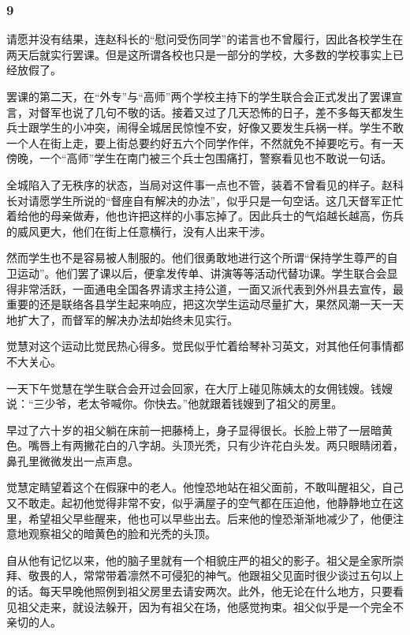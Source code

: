 \subsubsection*{9}

\par 请愿并没有结果，连赵科长的“慰问受伤同学”的诺言也不曾履行，因此各校学生在两天后就实行罢课。但是这所谓各校也只是一部分的学校，大多数的学校事实上已经放假了。
\par 罢课的第二天，在“外专”与“高师”两个学校主持下的学生联合会正式发出了罢课宣言，对督军也说了几句不敬的话。接着又过了几天恐怖的日子，差不多每天都发生兵士跟学生的小冲突，闹得全城居民惊惶不安，好像又要发生兵祸一样。学生不敢一个人在街上走，要上街总要约好五六个同学作伴，不然就免不掉要吃亏。有一天傍晚，一个“高师”学生在南门被三个兵士包围痛打，警察看见也不敢说一句话。
\par 全城陷入了无秩序的状态，当局对这件事一点也不管，装着不曾看见的样子。赵科长对请愿学生所说的“督座自有解决的办法”，似乎只是一句空话。这几天督军正忙着给他的母亲做寿，他也许把这样的小事忘掉了。因此兵士的气焰越长越高，伤兵的威风更大，他们在街上任意横行，没有人出来干涉。
\par 然而学生也不是容易被人制服的。他们很勇敢地进行这个所谓“保持学生尊严的自卫运动”。他们罢了课以后，便拿发传单、讲演等等活动代替功课。学生联合会显得非常活跃，一面通电全国各界请求主持公道，一面又派代表到外州县去宣传，最重要的还是联络各县学生起来响应，把这次学生运动尽量扩大，果然风潮一天一天地扩大了，而督军的解决办法却始终未见实行。
\par 觉慧对这个运动比觉民热心得多。觉民似乎忙着给琴补习英文，对其他任何事情都不大关心。
\par 一天下午觉慧在学生联合会开过会回家，在大厅上碰见陈姨太的女佣钱嫂。钱嫂说：“三少爷，老太爷喊你。你快去。”他就跟着钱嫂到了祖父的房里。
\par 早过了六十岁的祖父躺在床前一把藤椅上，身子显得很长。长脸上带了一层暗黄色。嘴唇上有两撇花白的八字胡。头顶光秃，只有少许花白头发。两只眼睛闭着，鼻孔里微微发出一点声息。
\par 觉慧定睛望着这个在假寐中的老人。他惶恐地站在祖父面前，不敢叫醒祖父，自己又不敢走。起初他觉得非常不安，似乎满屋子的空气都在压迫他，他静静地立在这里，希望祖父早些醒来，他也可以早些出去。后来他的惶恐渐渐地减少了，他便注意地观察祖父的暗黄色的脸和光秃的头顶。
\par 自从他有记忆以来，他的脑子里就有一个相貌庄严的祖父的影子。祖父是全家所崇拜、敬畏的人，常常带着凛然不可侵犯的神气。他跟祖父见面时很少谈过五句以上的话。每天早晚他照例到祖父房里去请安两次。此外，他无论在什么地方，只要看见祖父走来，就设法躲开，因为有祖父在场，他感觉拘束。祖父似乎是一个完全不亲切的人。
